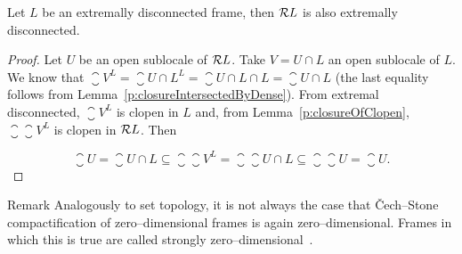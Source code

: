 \begin{proposition}\label{p:extrDiscPreserv}
    Let $L$ be an extremally disconnected frame, then $\mathcal{R} L$ is also extremally disconnected.
\end{proposition}
\begin{proof}
    Let $U$ be an open sublocale of $\mathcal{R} L$. Take $V = U\cap L$ an open sublocale of $L$. We know that $\closure V^L = \closure{U\cap L}^L = \closure{U\cap L}\cap L = \closure U\cap L$ (the last equality follows from Lemma~\ref{p:closureIntersectedByDense}). From extremal disconnected, $\closure V^L$ is clopen in $L$ and, from Lemma~\ref{p:closureOfClopen}, $\closure{\closure V^L}$ is clopen in $\mathcal{R} L$. Then

    $$ \closure U = \closure{U\cap L} \subseteq \closure{\closure{V}^L} = \closure{\closure U\cap L} \subseteq \closure{\closure U} = \closure U.$$
\end{proof}

\begin{block}{Remark}
    Analogously to set topology, it is not always the case that Čech--Stone compactification of zero--dimensional frames is again zero--dimensional. Frames in which this is true are called strongly zero--dimensional~\cite{kou2002strongly}.
\end{block}


